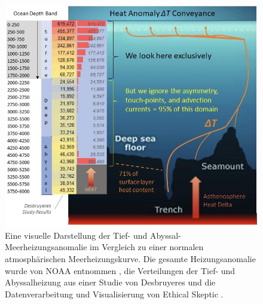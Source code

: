 \documentclass[10pt,twocolumn,letterpaper]{article}
\begin{document}
\begin{figure}[t]
\begin{center}
\includegraphics[width=1\textwidth]{deepsea.jpg}
\end{center}
   \caption{Eine visuelle Darstellung der Tief- und Abyssal-Meerheizungsanomalie im Vergleich zu einer normalen atmosphärischen Meerheizungskurve. Die gesamte Heizungsanomalie wurde von NOAA entnommen \cite{147}, die Verteilungen der Tief- und Abyssalheizung aus einer Studie von Desbruyeres \cite{132} und die Datenverarbeitung und Visualisierung von Ethical Skeptic \cite{129}.}
\label{fig:21}
\end{figure}
\end{document}
